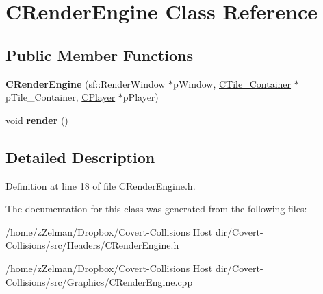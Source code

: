 \hypertarget{classCRenderEngine}{\section{C\-Render\-Engine Class Reference}
\label{classCRenderEngine}
}
\subsection*{Public Member Functions}
\begin{DoxyCompactItemize}
\item 
\hypertarget{classCRenderEngine_abb9a5a04b9c51e6ee44d0a51a6633d8d}{{\bfseries C\-Render\-Engine} (sf\-::\-Render\-Window $\ast$p\-Window, \hyperlink{classCTile__Container}{C\-Tile\-\_\-\-Container} $\ast$p\-Tile\-\_\-\-Container, \hyperlink{classCPlayer}{C\-Player} $\ast$p\-Player)}\label{classCRenderEngine_abb9a5a04b9c51e6ee44d0a51a6633d8d}

\item 
\hypertarget{classCRenderEngine_a38c058de2a8b54f208decdaa7b799ada}{void {\bfseries render} ()}\label{classCRenderEngine_a38c058de2a8b54f208decdaa7b799ada}

\end{DoxyCompactItemize}


\subsection{Detailed Description}


Definition at line 18 of file C\-Render\-Engine.\-h.



The documentation for this class was generated from the following files\-:\begin{DoxyCompactItemize}
\item 
/home/z\-Zelman/\-Dropbox/\-Covert-\/\-Collisions Host dir/\-Covert-\/\-Collisions/src/\-Headers/C\-Render\-Engine.\-h\item 
/home/z\-Zelman/\-Dropbox/\-Covert-\/\-Collisions Host dir/\-Covert-\/\-Collisions/src/\-Graphics/C\-Render\-Engine.\-cpp\end{DoxyCompactItemize}
